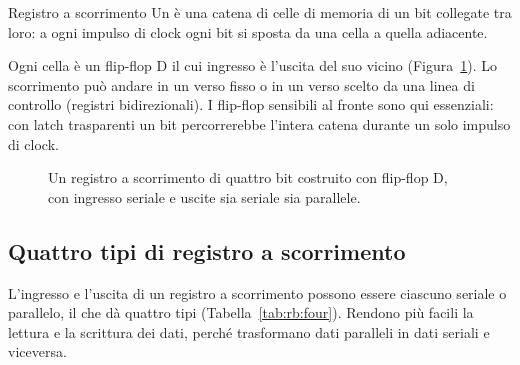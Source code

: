 \begin{definition}{Registro a scorrimento}
Un   è una catena di celle di
memoria di un bit collegate tra loro: a ogni impulso di clock ogni bit si
sposta da una cella a quella adiacente.
\end{definition}

Ogni cella è un flip-flop D il cui ingresso è l'uscita del suo vicino
(Figura~\ref{fig:rb:sipo}). Lo scorrimento può andare in un verso fisso o in un
verso scelto da una linea di controllo (registri bidirezionali). I flip-flop
sensibili al fronte sono qui essenziali: con latch trasparenti un bit
percorrerebbe l'intera catena durante un solo impulso di clock.

\begin{figure}[htb]
\centering
{}
\caption{Un registro a scorrimento di quattro bit costruito con flip-flop D,
con ingresso seriale e uscite sia seriale sia parallele.}
\label{fig:rb:sipo}
\end{figure}

\subsection{Quattro tipi di registro a scorrimento}

L'ingresso e l'uscita di un registro a scorrimento possono essere ciascuno
seriale o parallelo, il che dà quattro tipi (Tabella~\ref{tab:rb:four}).
Rendono più facili la lettura e la scrittura dei dati, perché trasformano dati
paralleli in dati seriali e viceversa.

